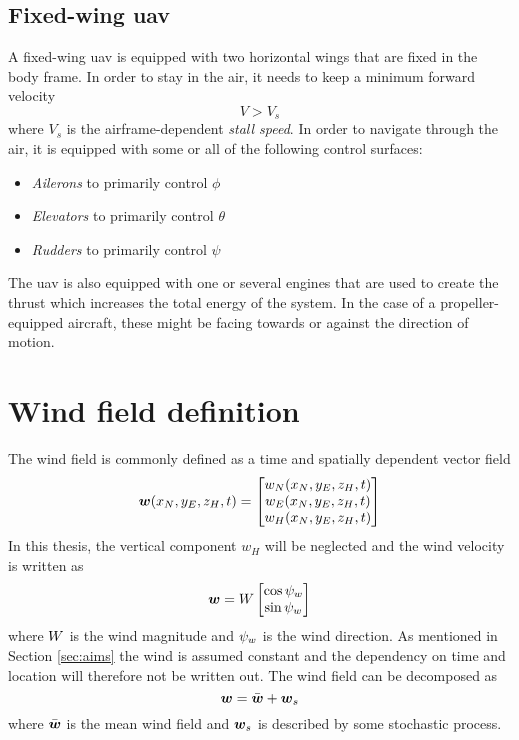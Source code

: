 \subsection{Fixed-wing \ac{uav}}
A fixed-wing \ac{uav} is equipped with two horizontal wings that are fixed in the body frame.
In order to stay in the air, it needs to keep a minimum forward velocity
\begin{equation}
    V > V_{s}
\end{equation}
where $V_s$ is the airframe-dependent \textit{stall speed}. In order to navigate through the
air, it is equipped with some or all of the following control surfaces:
\begin{itemize}
    \item \textit{Ailerons} to primarily control $\phi$
    \item \textit{Elevators} to primarily control $\theta$
    \item \textit{Rudders} to primarily control $\psi$
\end{itemize}
The \ac{uav} is also equipped with one or several engines that are used to create the thrust which
increases the total energy of the system. In the case of a propeller-equipped aircraft, these might be facing towards or against the direction of motion.

\section{Wind field definition}
The wind field is commonly defined as a time and spatially dependent vector field
\begin{equation}
    \boldsymbol{w}(x_N,y_E,z_H,t)=
    \begin{bmatrix}
        w_N(x_N,y_E,z_H,t) \\
        w_E(x_N,y_E,z_H,t) \\
        w_H(x_N,y_E,z_H,t)
    \end{bmatrix}
\end{equation}
In this thesis, the vertical component $w_H$ will be neglected and the wind velocity is written as 
\begin{equation}
    \boldsymbol{w}=W\begin{bmatrix}
        \cos\psi_w\\
        \sin\psi_w
    \end{bmatrix}
\end{equation}
where $W$ is the wind magnitude and $\psi_w$ is the wind direction. 
As mentioned in Section \ref{sec:aims} the wind is assumed constant and the dependency on time and location will therefore not be written out.
The wind field can be decomposed as
\begin{equation}
    \boldsymbol{w} = \bar{\boldsymbol{w}} + \boldsymbol{w}_s
\end{equation}
where $\bar{\boldsymbol{w}}$ is the mean wind field and $\boldsymbol{w}_s$ is described by some stochastic process.

